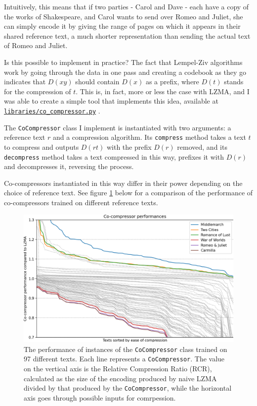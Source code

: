 Intuitively, this means that if two parties - Carol and Dave - each have a copy of the works of Shakespeare, and Carol wants to send over Romeo and Juliet, she can simply encode it by giving the range of pages on which it appears in their shared reference text, a much shorter representation than sending the actual text of Romeo and Juliet.

Is this possible to implement in practice? The fact that Lempel-Ziv algorithms work by going through the data in one pass and creating a codebook as they go indicates that $D(xy)$ should contain $D(x)$ as a prefix, where $D(t)$ stands for the compression of $t$. This is, in fact, more or less the case with LZMA, and I was able to create a simple tool that implements this idea, available at \texttt{\href{https://github.com/Guy29/FYP/blob/main/Code/libraries/co_compressor.py}{libraries/co\_compressor.py}} .

The \texttt{CoCompressor} class I implement is instantiated with two arguments: a reference text $r$ and a compression algorithm. Its \texttt{compress} method takes a text $t$ to compress and outputs $D(rt)$ with the prefix $D(r)$ removed, and its \texttt{decompress} method takes a text compressed in this way, prefixes it with $D(r)$ and decompresses it, reversing the process.

Co-compressors instantiated in this way differ in their power depending on the choice of reference text. See figure \ref{fig:cocomp_comparison} below for a comparison of the performance of co-compressors trained on different reference texts.

\begin{figure}[h]
\centering
\includegraphics[width=\textwidth]{img/fig_cocomp_performance.png}
\caption{The performance of instances of the \texttt{CoCompressor} class trained on 97 different texts. Each line represents a \texttt{CoCompressor}. The value on the vertical axis is the Relative Compression Ratio (RCR), calculated as the size of the encoding produced by naive LZMA divided by that produced by the \texttt{CoCompressor}, while the horizontal axis goes through possible inputs for comrpession.}
\label{fig:cocomp_comparison}
\end{figure}

